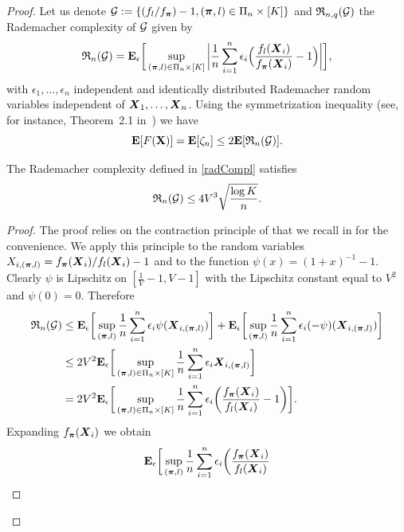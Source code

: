 \begin{proof}
	Let us denote $\mathcal G:=\{(f_l/f_{\boldsymbol \pi})-1, (\boldsymbol \pi,l)\in\Pi_n\times [K]\}$ and $\mathfrak{R}_{n,q}(\mathcal G)$ the Rademacher
	complexity of $\mathcal G$ given by
	\begin{equation}
	\label{radCompl}
	\mathfrak{R}_{n}(\mathcal G) = \mathbf E_{\epsilon}\bigg[ \sup_{(\boldsymbol \pi,l)\in\Pi_n\times[K]}\bigg| \frac{1}{n}\sum_{i=1}^n
	\epsilon_i\Big(\frac{f_l(\boldsymbol X_i)}{f_{\boldsymbol \pi}(\boldsymbol X_i)}-1\Big)\bigg| \bigg],
	\end{equation}
	with $\epsilon_1,\dots,\epsilon_n$ independent and identically distributed Rademacher random variables independent
	of $\boldsymbol X_1,\dots,\boldsymbol X_n$. Using the symmetrization inequality (see, for instance, Theorem~2.1 in~\cite{KoltBook2011})
	we have
	\begin{equation}
	\label{rademacher}
	\mathbf E[F(\mathbf X)] = \mathbf E[\zeta_n] \leq 2\mathbf E[\mathfrak{R}_{n}(\mathcal G)].
	\end{equation}
	\begin{lemma}
		\label{boundRademComplex}
		The Rademacher complexity defined in \eqref{radCompl} satisfies
		\begin{equation}
		\mathfrak{R}_n(\mathcal G) \leq  4V^3\sqrt{\frac{\log K}{n}}.
		\end{equation}
	\end{lemma}
	\begin{proof}
		The proof relies on the contraction principle of \cite{LedouxTal:91} that we recall in
		 for the convenience. We apply this principle to the random variables
		$X_{i,(\boldsymbol \pi,l)}=f_{\boldsymbol \pi}(\boldsymbol X_i)/f_l(\boldsymbol X_i)-1$ and to the function $\psi(x) = (1+x)^{-1}-1$.
		Clearly $\psi$ is Lipschitz on
		$[\frac{1}{V}-1,V-1]$ with the Lipschitz constant equal to $V^2$ and $\psi(0)=0$. Therefore
		\begin{align}
		\mathfrak{R}_{n}(\mathcal G)
		& \le  \mathbf E_{\epsilon}\bigg[ \sup_{(\boldsymbol \pi,l)} \frac{1}{n}\sum_{i=1}^n
		\epsilon_i\psi(\boldsymbol X_{i,(\boldsymbol \pi,l)})\bigg]
		+\mathbf E_{\epsilon}\bigg[ \sup_{(\boldsymbol \pi,l)}\frac{1}{n}\sum_{i=1}^n
		\epsilon_i(-\psi)(\boldsymbol X_{i,(\boldsymbol \pi,l)})\bigg]\nonumber\\
		&\leq 2V^2\mathbf E_{\epsilon}\bigg[ \sup_{(\boldsymbol \pi,l)\in\Pi_n\times[K]}\frac{1}{n}
		\sum_{i=1}^n \epsilon_i \boldsymbol X_{i,(\boldsymbol \pi,l)} \bigg]\nonumber\\
		&= 2V^2 \mathbf E_{\epsilon}\bigg[ \sup_{(\boldsymbol \pi,l)\in\Pi_n\times[K]}\frac{1}{n}\sum_{i=1}^n \epsilon_i
		\bigg(\frac{f_{\boldsymbol \pi}(\boldsymbol X_i)}{f_l(\boldsymbol X_i)} -1\bigg) \bigg].
		\end{align}
		Expanding $f_{\boldsymbol \pi}(\boldsymbol X_i)$ we obtain
		\begin{align}
		\Ex_{\epsilon}\bigg[ \sup_{(\bpi,l)}\frac{1}{n}\sum_{i=1}^n \epsilon_i \bigg(\frac{f_{\bpi}(\bX_i)}{f_l(\bX_i)}

\end{align}
\end{proof}
\end{proof}
